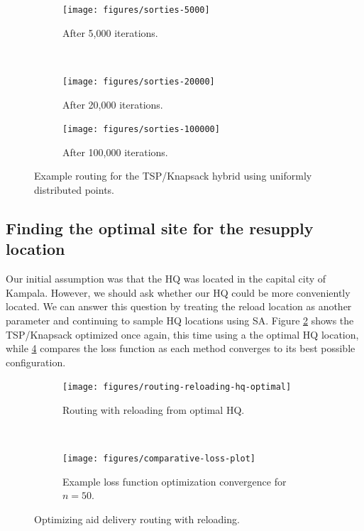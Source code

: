\documentclass{article} %
\begin{document}
\begin{figure}[H]
  \centering
  \begin{subfigure}[b]{0.5\textwidth}
    \centering
    \texttt{[image: figures/sorties-5000]}
    \caption{After 5,000 iterations.}
  \end{subfigure}~\begin{subfigure}[b]{0.5\textwidth}
    \centering
    \texttt{[image: figures/sorties-20000]}
    \caption{After 20,000 iterations.}
  \end{subfigure}
  \begin{subfigure}[b]{\textwidth}
    \centering
    \texttt{[image: figures/sorties-100000]}
    \caption{After 100,000 iterations.}
  \end{subfigure}
  \caption{Example routing for the TSP/Knapsack hybrid using uniformly distributed points.}
  \label{fig:sorties}
\end{figure}

\subsection{Finding the optimal site for the resupply location}

Our initial assumption was that the HQ was located in the capital city of Kampala. However, we should ask whether our HQ could be more conveniently located. We can answer this question by treating the reload location as another parameter and continuing to sample HQ locations using SA. Figure \ref{fig:routing-reloading-hq-optimal} shows the TSP/Knapsack optimized once again, this time using a the optimal HQ location, while \ref{fig:comparative-loss-plot} compares the loss function as each method converges to its best possible configuration.

\begin{figure}
  \centering
  \begin{subfigure}[b]{0.5\columnwidth}
    \centering
    \texttt{[image: figures/routing-reloading-hq-optimal]}
    \caption{Routing with reloading from optimal HQ.}
    \label{fig:routing-reloading-hq-optimal}
  \end{subfigure}~\begin{subfigure}[b]{0.46\columnwidth}
    \centering
    \centering
    \texttt{[image: figures/comparative-loss-plot]}
    \caption{Example loss function optimization convergence for $n=50$.}
    \label{fig:comparative-loss-plot}
  \end{subfigure}
  \caption{Optimizing aid delivery routing with reloading.}
\end{figure}
\end{document}
